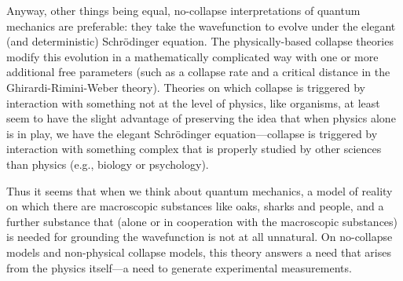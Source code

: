 Anyway, other things being equal, no-collapse interpretations of quantum mechanics are preferable: they take the wavefunction 
to evolve under the elegant (and deterministic) Schr\"{o}dinger equation. The physically-based collapse theories modify this
evolution in a mathematically complicated way with one or more additional free parameters (such as a collapse rate and a
critical distance in the Ghirardi-Rimini-Weber theory). Theories on which collapse is triggered by interaction with something
not at the level of physics, like organisms, at least seem to have the slight advantage of preserving the idea that when physics alone is in play,
we have the elegant Schr\"{o}dinger equation---collapse is triggered by interaction with something complex that is properly 
studied by other sciences than physics (e.g., biology or psychology). 

Thus it seems that when we think about quantum mechanics, a model of reality on which there are macroscopic substances like
oaks, sharks and people, and a further substance that (alone or in cooperation with the macroscopic substances) is needed
for grounding the wavefunction is not at all unnatural. On no-collapse models and non-physical collapse models, this theory 
answers a need that arises from the physics itself---a need to generate experimental measurements.



\chaptertail
